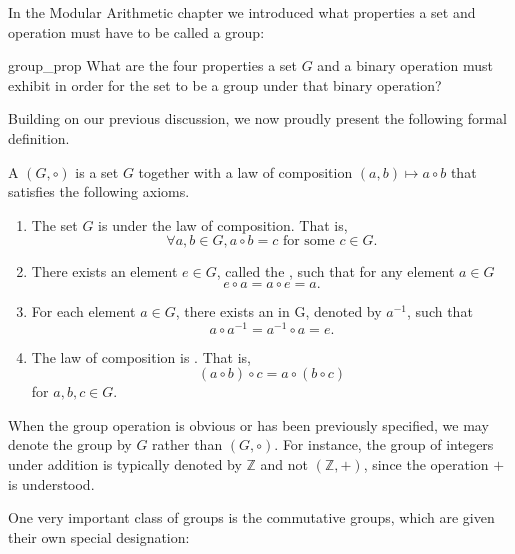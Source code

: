 In the Modular Arithmetic chapter we introduced what properties a set and operation must have to be called a group:

\begin{exercise}{group_prop}
What are the four properties a set $G$ and a binary operation must exhibit in order for the set to be a group under that binary operation?
\end{exercise}
Building on our previous discussion, we now  proudly present the following formal definition.

\begin{defn}\label{group_definition}
 A  $(G, \circ )$ is a set $G$ together with a law of composition $(a,b) \mapsto a \circ b$ that satisfies the following axioms. 
\begin{enumerate}
\item
The set $G$ is  under the law of composition.  That is, 
\[
\forall a,b \in G, a \circ b = c \mbox{ for some } c \in G .
\]
\item
There exists an element $e \in G$, called the , such that for any element $a \in G$ 
\[
e \circ a = a \circ e = a.
\]
\item
For each element $a \in G$, there exists an  in G, denoted by $a^{-1}$, such that 
\[
a \circ a^{-1} = a^{-1} \circ a = e.
\]
\item
The law of composition is . That is,
\[
(a \circ b) \circ c = a \circ (b \circ c)
\]
for $a, b, c \in G$.
 
\end{enumerate}
\end{defn}

\begin{rem}
When the group operation is obvious or has been previously specified, we may denote the group by $G$ rather than $(G,\circ)$.  For instance, the group of integers under addition is typically denoted by ${\mathbb Z}$ and not $({\mathbb Z},+)$, since the operation $+$ is understood. 
\end{rem}

One very important class of groups is the commutative groups, which are given their own special designation:

